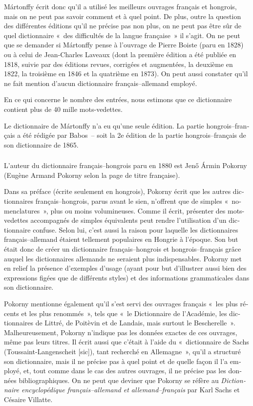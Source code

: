 \documentclass[output=paper,colorlinks,citecolor=brown,arabicfont,chinesefont,booklanguage=french]{langscibook}
\begin{document}
\begin{otherlanguage}{french}
Mártonffy écrit donc qu’il a utilisé les meilleurs ouvrages français et hongrois, mais on ne peut pas savoir comment et à quel point. De plus, outre la question des différentes éditions qu’il ne précise pas non plus, on ne peut pas être sûr de quel dictionnaire «~des difficultés de la langue française~» il s’agit. On ne peut que se demander si Mártonffy pense à l’ouvrage de Pierre Boiste (paru en 1828) ou à celui de Jean-Charles Laveaux (dont la première édition a été publiée en 1818, suivie par des éditions revues, corrigées et augmentées, la deuxième en 1822, la troisième en 1846 et la quatrième en 1873). On peut aussi constater qu’il ne fait mention d’aucun dictionnaire français–allemand employé.

En ce qui concerne le nombre des entrées, nous estimons que ce dictionnaire contient plus de 40 mille mots-vedettes.

Le dictionnaire de Mártonffy n’a eu qu’une seule édition. La partie hongrois–français a été rédigée par Babos~-- soit la 2e édition de la partie hongrois–français de son dictionnaire de 1865.

\subsubsection{\citealt{Pokorny1880} }\label{sec:tillinger:2.1.3}

L’auteur du dictionnaire français–hongrois paru en 1880 est Jenő Ármin Pokorny (Eugène Armand Pokorny selon la page de titre française). 

Dans sa préface (écrite seulement en hongrois), Pokorny écrit que les autres dictionnaires français–hongrois, parus avant le sien, n’offrent que de simples «~nomenclatures~», plus ou moins volumineuses. Comme il écrit, présenter des mots-vedettes accompagnés de simples équivalents peut rendre l’utilisation d’un dictionnaire confuse. Selon lui, c’est aussi la raison pour laquelle les dictionnaires français–allemand étaient tellement populaires en Hongrie à l’époque. Son but était donc de créer un dictionnaire français–hongrois et hongrois–français grâce auquel les dictionnaires allemands ne seraient plus indispensables. Pokorny met en relief la présence d'exemples d’usage (ayant pour but d’illustrer aussi bien des expressions figées que de différents styles) et des informations grammaticales dans son dictionnaire.

Pokorny mentionne également qu’il s’est servi des ouvrages français «~les plus récents et les plus renommés~», tels que «~le Dictionnaire de l’Académie, les dictionnaires de Littré, de Poitèvin et de Landais, mais surtout le Bescherelle~». Malheureusement, Pokorny n’indique pas les données exactes de ces ouvrages, même pas leurs titres. Il écrit aussi que c’était à l’aide du «~dictionnaire de Sachs (Toussaint-Langenscheit [sic]), tant recherché en Allemagne~», qu’il a structuré son dictionnaire, mais il ne précise pas à quel point et de quelle façon il l’a employé, et, tout comme dans le cas des autres ouvrages, il ne précise pas les données bibliographiques. On ne peut que deviner que Pokorny se réfère au \emph{Dictionnaire encyclopédique français–allemand et allemand–français} par Karl Sachs et Césaire Villatte.


\end{otherlanguage}
\end{document}
